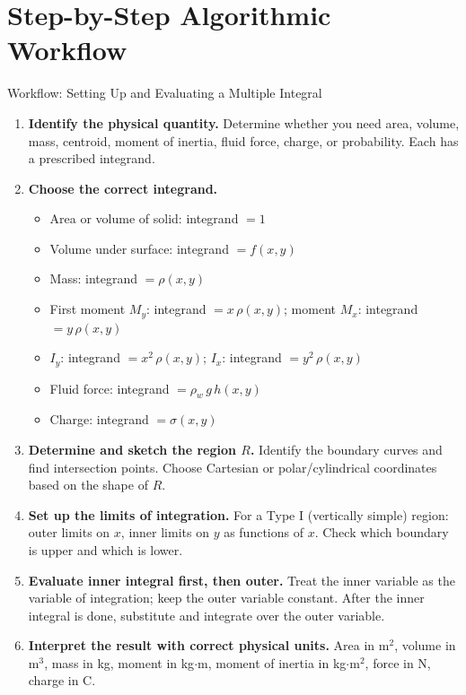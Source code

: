 \documentclass[12pt,a4paper]{article}
\begin{document}
\section{Step-by-Step Algorithmic Workflow}

\begin{infobox}{Workflow: Setting Up and Evaluating a Multiple Integral}
\begin{enumerate}[label=\textbf{Step \arabic*.}]
  \item \textbf{Identify the physical quantity.}
        Determine whether you need area, volume, mass, centroid, moment of inertia, fluid force, charge, or probability. Each has a prescribed integrand.
  \item \textbf{Choose the correct integrand.}
        \begin{itemize}
          \item Area or volume of solid: integrand \(= 1\)
          \item Volume under surface: integrand \(= f(x,y)\)
          \item Mass: integrand \(= \rho(x,y)\)
          \item First moment \(M_y\): integrand \(= x\,\rho(x,y)\); moment \(M_x\): integrand \(= y\,\rho(x,y)\)
          \item \(I_y\): integrand \(= x^2\,\rho(x,y)\); \(I_x\): integrand \(= y^2\,\rho(x,y)\)
          \item Fluid force: integrand \(= \rho_w\,g\,h(x,y)\)
          \item Charge: integrand \(= \sigma(x,y)\)
        \end{itemize}
  \item \textbf{Determine and sketch the region \(R\).}
        Identify the boundary curves and find intersection points. Choose Cartesian or polar/cylindrical coordinates based on the shape of \(R\).
  \item \textbf{Set up the limits of integration.}
        For a Type I (vertically simple) region: outer limits on \(x\), inner limits on \(y\) as functions of \(x\). Check which boundary is upper and which is lower.
  \item \textbf{Evaluate inner integral first, then outer.}
        Treat the inner variable as the variable of integration; keep the outer variable constant. After the inner integral is done, substitute and integrate over the outer variable.
  \item \textbf{Interpret the result with correct physical units.}
        Area in m\(^2\), volume in m\(^3\), mass in kg, moment in kg\(\cdot\)m, moment of inertia in kg\(\cdot\)m\(^2\), force in N, charge in C.
\end{enumerate}
\end{infobox}
\end{document}
